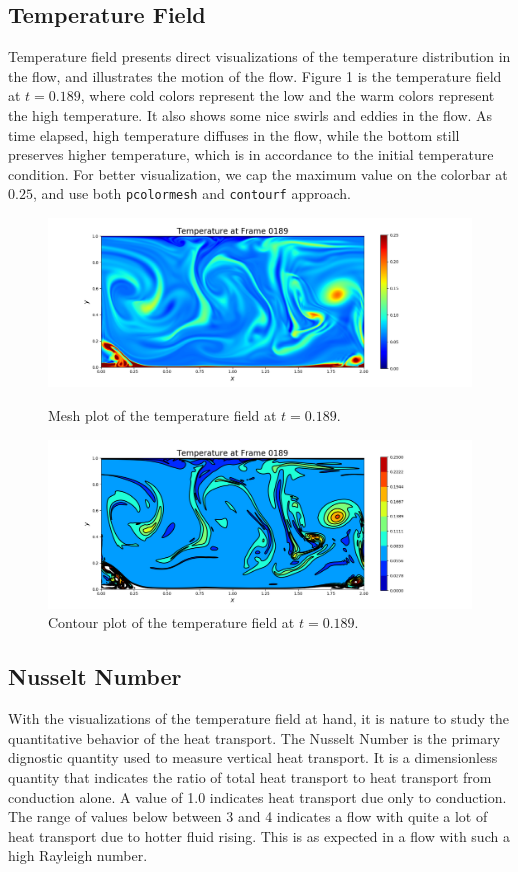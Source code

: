 \documentclass[11pt]{article} %
\begin{document}
\subsection{Temperature Field}
Temperature field presents direct visualizations of the temperature distribution in the flow, and illustrates the motion of the flow. Figure 1 is the temperature field at $t=0.189$, where cold colors represent the low and the warm colors represent the high temperature. It also shows some nice swirls and eddies in the flow. As time elapsed, high temperature diffuses in the flow, while the bottom still preserves higher temperature, which is in accordance to the initial temperature condition. For better visualization, we cap the maximum value on the colorbar 
at $0.25$, and use both \texttt{pcolormesh} and \texttt{contourf} approach.
\begin{figure}[h!]
\centering
\hspace*{-0.25in}
\includegraphics[width=1.2\textwidth]{temperature.png}
\caption{Mesh plot of the temperature field at $t=0.189$.}
\hspace*{-0.25in}
\includegraphics[width=1.2\textwidth]{temperature_contour.png}
\caption{Contour plot of the temperature field at $t=0.189$.}
\end{figure}
\newpage

\subsection{Nusselt Number}
With the visualizations of the temperature field at hand, it is nature to study the quantitative behavior of the heat transport. The Nusselt Number is the primary dignostic quantity used to measure vertical heat transport.  It is a dimensionless quantity that indicates the ratio of total heat transport to heat transport from conduction alone.  A value of 1.0 indicates heat transport due only to conduction.
The range of values below between 3 and 4 indicates a flow with quite
a lot of heat transport due to hotter fluid rising.  
This is as expected in a flow with such a high Rayleigh number.
\end{document}

